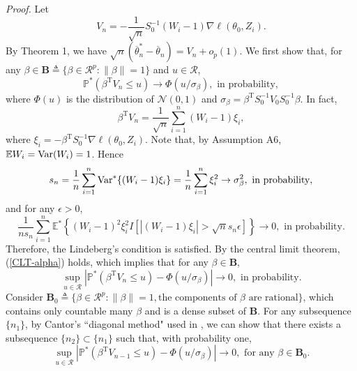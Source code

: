 \documentclass[twoside,11pt]{article}
\def\Var{\mathop{\rm Var}}
\def\trans{^{ \mathrm{\scriptscriptstyle T} }}
\def\ol{\overline}
\begin{document}
{\it Proof.}  Let
\begin{equation}\label{V-n}
V_n=-\frac{1}{\sqrt{n}}S_0^{-1}(W_i-1)\nabla \ell(\theta_0, Z_i).
\end{equation}
By Theorem 1, we have $\sqrt{n}(\ol{\theta}^*_n-\ol{\theta}_n)=V_n+o_p(1)$. We first show that, for any $\beta \in \mathbf{B}\triangleq\{\beta\in\mathcal{R}^p: \|\beta\|=1\}$ and $u\in\mathcal{R}$,
\begin{equation}\label{CLT-alpha}
\mathbb{P}^*\left(\beta\trans V_n\leq u\right)\rightarrow\Phi(u/\sigma_{\beta}), {\mbox{\ in\ probability}},
\end{equation}
where $\Phi(u)$ is the distribution of $\mathcal{N}(0, 1)$ and $\sigma_{\beta}=\beta\trans S_0^{-1}V_0 S_0^{-1}\beta$. In fact,
\begin{equation}\label{V-n-xi}
\beta\trans V_n=\frac{1}{\sqrt{n}} \sum_{i=1}^n (W_i-1)\xi_i,
\end{equation}
where $\xi_i=-\beta\trans S_0^{-1}\nabla \ell(\theta_0, Z_i)$. Note that, by Assumption A6, $\mathbb{E} W_i= \Var(W_i)=1$. Hence
\begin{equation}\label{s-n}
s_n=\frac{1}{n}\sum_{i=1}^n{\Var}^*\{(W_i-1)\xi_i\}=\frac{1}{n}\sum_{i=1}^n\xi_i^2\rightarrow \sigma^2_{\beta}, {\mbox{\ in\ probability}},
\end{equation}
and for any $\epsilon>0$,
\begin{equation}\label{Lind-cond}
\frac{1}{ns_n}\sum_{i=1}^{n}\mathbb{E}^*\left\{(W_i-1)^2\xi_i^2I\left[|(W_i-1)\xi_i|>\sqrt{n}s_n\epsilon\right]\right\}\rightarrow 0, {\mbox{\ in\ probability}}.
\end{equation}
Therefore, the Lindeberg's condition is satisfied. By the central limit theorem, (\ref{CLT-alpha}) holds, which implies that for any $\beta \in \mathbf{B}$,
\begin{equation}\label{CLT-alpha-sup}
\sup_{u\in\mathcal{R}}\left|\mathbb{P}^*\left(\beta\trans V_n\leq u\right)-\Phi(u/\sigma_{\beta})\right|\rightarrow 0, {\mbox{\ in\ probability}}.
\end{equation}
Consider $\mathbf{B}_0\triangleq\{\beta\in\mathcal{R}^p: \|\beta\|=1, \mbox{the\ components\ of\ }\beta \mbox{\ are\ rational}\}$, which contains only countable many $\beta$ and is a dense subset of $\mathbf{B}$. For any subsequence $\{n_1\}$, by Cantor's ``diagonal method" used in \citet{Rao92}, we can show that there exists a subsequence $\{n_2\}\subset \{n_1\}$ such that, with probability one,
\begin{equation}\label{CLT-alpha-sup-any}
\sup_{u\in\mathcal{R}}\left|\mathbb{P}^*\left(\beta\trans V_{n-1}\leq u\right)-\Phi(u/\sigma_{\beta})\right|\rightarrow 0, \mbox{\ for \ any \ } \beta\in\mathbf{B}_0.
\end{equation}
\end{document}
